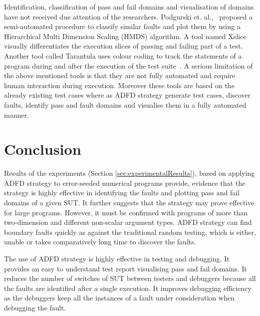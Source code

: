 Identification, classification of pass and fail domains and visualisation of domains have not received due attention of the researchers. Podgurski et. al.,~\cite{Podgurski2003} proposed a semi-automated procedure to classify similar faults and plot them by using a Hierarchical Multi Dimension Scaling (HMDS) algorithm. A tool named Xslice~\cite{agrawal1995fault} visually differentiates the execution slices of passing and failing part of a test. Another tool called Tarantula uses colour coding to track the statements of a program during and after the execution of the test suite~\cite{Jones2002}. A serious limitation of the above mentioned tools is that they are not fully automated and require human interaction during execution. Moreover these tools are based on the already existing test cases where as ADFD strategy generate test cases, discover faults, identify pass and fault domains and visualise them in a fully automated manner. 


\section{Conclusion} \label{sec:conclusion}

Results of the experiments (Section \ref{sec:experimentalResults}), based on applying ADFD strategy to error-seeded numerical programs provide, evidence that the strategy is highly effective in identifying the faults and plotting pass and fail domains of a given SUT. It further suggests that the strategy may prove effective for large programs. However, it must be confirmed with programs of more than two-dimension and different non-scalar argument types. ADFD strategy can find boundary faults quickly as against the traditional random testing, which is either, unable or takes comparatively long time to discover the faults.

The use of ADFD strategy is highly effective in testing and debugging. It provides an easy to understand test report visualising pass and fail domains. It reduces the number of switches of SUT between testers and debuggers because all the faults are identified after a single execution. It improves debugging efficiency as the debuggers keep all the instances of a fault under consideration when debugging the fault.








